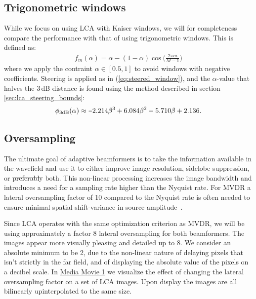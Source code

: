 \documentclass[10pt,journal,draftclsnofoot,onecolumn]{IEEEtran}
\newcounter{todoidx}
\newlength\marginparwidthsmall
\newcommand\todo[1]{%
      \addtocounter{todoidx}{1}%
      {\color{Red}\bf(\thetodoidx{})}%
      \marginpar{%
         {\vspace*{-10pt}\color{Red}\fbox{\bf\thetodoidx{}}}\\%
         \fcolorbox{red}{todobackground}{\parbox{\marginparwidthsmall}{\raggedright\scriptsize #1}}}}
\newcommand\todo[1]{}
\newcommand\1{\vec 1}
\newcommand\minus{\scalebox{0.75}[1.0]{$-$}}
\newcommand\multimedia[2]{\href{#1}{#2}}
\newcommand\mediaPath{gfx/media} %
\newcommand\mediaI{\multimedia{\mediaPath/media1.mp4}{Media Movie 1}} %
\providecommand{\DIFadd}[1]{{\protect\color{blue}\uwave{#1}}} %
\providecommand{\DIFdel}[1]{{\protect\color{red}\sout{#1}}}                      %
\providecommand{\DIFaddbegin}{} %
\providecommand{\DIFaddend}{} %
\providecommand{\DIFdelbegin}{} %
\providecommand{\DIFdelend}{} %
\begin{document}
\subsection{Trigonometric windows}\label{sec:lca_trigonometric}

While we focus on using LCA with Kaiser windows, we will for completeness compare the performance with that of using trigonometric windows. This is defined as:
%
\begin{align}
f_m(\alpha) = \alpha - (1-\alpha)\cos\Big(\frac{2\pi m}{M-1}\Big)\label{eq:trig_window_function}
\end{align}
%
where we apply the contraint $\alpha\in[0.5,1]$ to avoid windows with negative coefficients. Steering is applied as in (\ref{eq:steered_window}), and the $\alpha$-value that halves the 3\,dB distance is found using the method described in section \ref{sec:lca_steering_bounds}:
%
\begin{align}
\phi_\text{3dB}(\alpha) \approx \minus{}2.214\beta^3 + 6.084\beta^2 - 5.710\beta + 2.136.
\end{align}


\subsection{Oversampling}\label{sec:lca_oversampling}

The ultimate goal of adaptive beamformers is to take the information available in the wavefield and use it to either improve image resolution, \DIFdelbegin \DIFdel{sidelobe }\DIFdelend \DIFaddbegin \DIFadd{noise }\DIFaddend suppression, or \DIFdelbegin \DIFdel{preferably }\DIFdelend both. This non-linear processing increases the image bandwidth and introduces a need for a sampling rate higher than the Nyquist rate. For MVDR a lateral oversampling factor of 10 compared to the Nyquist rate is often needed to ensure minimal spatial shift-variance in source amplitude~\cite{Asen2014}.

Since LCA operates with the same optimization criterion as MVDR, we will be using approximately a factor 8 lateral oversampling for both beamformers. The images appear more visually pleasing and detailed up to 8. We consider an absolute minimum to be 2, due to the non-linear nature of delaying pixels that isn't strictly in the far field, and of displaying the absolute value of the pixels on a decibel scale. In \mediaI{} we visualize the effect of changing the lateral oversampling factor on a set of LCA images. Upon display the images are all bilinearly upinterpolated to the same size. 
% 
\end{document}
